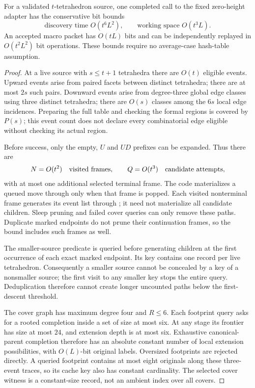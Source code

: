 \begin{proposition}
\label{prop:pachner-descent-crushing-cost}
For a validated $t$-tetrahedron source, one completed call to the fixed
zero-height adapter has the conservative bit bounds
\[
 \text{discovery time }O(t^6L^2),\qquad
 \text{working space }O(t^3L).
\]
An accepted macro packet has $O(tL)$ bits and can be independently
replayed in $O(t^2L^2)$ bit operations.  These bounds require no
average-case hash-table assumption.
\end{proposition}
\begin{proof}
At a live source with $s\le t+1$ tetrahedra there are $O(t)$ eligible
events.  Upward events arise from paired facets between distinct
tetrahedra; there are at most $2s$ such pairs.  Downward events arise
from degree-three global edge classes using three distinct tetrahedra;
there are $O(s)$ classes among the $6s$ local edge incidences.
Preparing the full table and checking the formal regions is covered by
$P(s)$; this event count does not declare every combinatorial edge
eligible without checking its actual region.

Before success, only the empty, $U$ and $UD$ prefixes can be expanded.
Thus there are
\[
                  N=O(t^2)\quad\hbox{visited frames},\qquad
                  Q=O(t^3)\quad\hbox{candidate attempts},
\]
with at most one additional selected terminal frame.  The code
materializes a queued move through  only when that frame
is popped.  Each visited nonterminal frame generates its event list
through ; it need not materialize all candidate children.
Sleep pruning and failed cover queries can only remove these paths.
Duplicate marked endpoints do not prune their continuation frames, so
the bound includes such frames as well.

The smaller-source predicate is queried before generating children at
the first occurrence of each exact marked endpoint.  Its key contains
one record per live tetrahedron.  Consequently a smaller source cannot
be concealed by a key of a nonsmaller source; the first visit to any
smaller key stops the entire query.  Deduplication therefore cannot
create longer uncounted paths below the first-descent threshold.

The cover graph has maximum degree four and $R\le6$.  Each footprint
query asks for a rooted completion inside a set of size at most six.
At any stage its frontier has size at most $24$, and extension depth
is at most six.  Exhaustive canonical-parent completion therefore has
an absolute constant number of local extension possibilities, with
$O(L)$-bit original labels.  Oversized footprints are rejected directly.
A queried footprint contains at most eight originals along these
three-event traces, so its cache key also has constant cardinality.
The selected cover witness is a constant-size record, not an ambient
index over all covers.


\end{proof}
